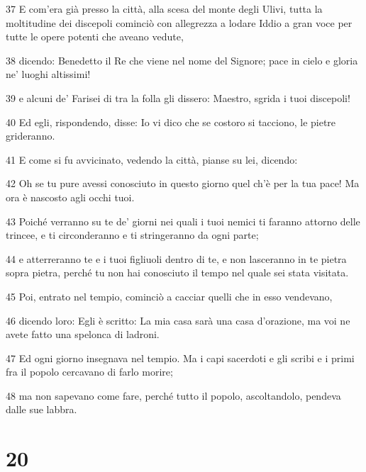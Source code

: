 \par 37 E com'era già presso la città, alla scesa del monte degli Ulivi, tutta la moltitudine dei discepoli cominciò con allegrezza a lodare Iddio a gran voce per tutte le opere potenti che aveano vedute,
\par 38 dicendo: Benedetto il Re che viene nel nome del Signore; pace in cielo e gloria ne' luoghi altissimi!
\par 39 e alcuni de' Farisei di tra la folla gli dissero: Maestro, sgrida i tuoi discepoli!
\par 40 Ed egli, rispondendo, disse: Io vi dico che se costoro si tacciono, le pietre grideranno.
\par 41 E come si fu avvicinato, vedendo la città, pianse su lei, dicendo:
\par 42 Oh se tu pure avessi conosciuto in questo giorno quel ch'è per la tua pace! Ma ora è nascosto agli occhi tuoi.
\par 43 Poiché verranno su te de' giorni nei quali i tuoi nemici ti faranno attorno delle trincee, e ti circonderanno e ti stringeranno da ogni parte;
\par 44 e atterreranno te e i tuoi figliuoli dentro di te, e non lasceranno in te pietra sopra pietra, perché tu non hai conosciuto il tempo nel quale sei stata visitata.
\par 45 Poi, entrato nel tempio, cominciò a cacciar quelli che in esso vendevano,
\par 46 dicendo loro: Egli è scritto: La mia casa sarà una casa d'orazione, ma voi ne avete fatto una spelonca di ladroni.
\par 47 Ed ogni giorno insegnava nel tempio. Ma i capi sacerdoti e gli scribi e i primi fra il popolo cercavano di farlo morire;
\par 48 ma non sapevano come fare, perché tutto il popolo, ascoltandolo, pendeva dalle sue labbra.

\chapter{20}

